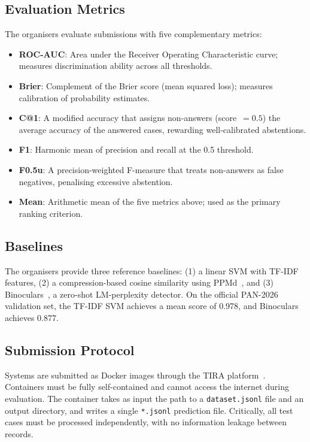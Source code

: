 \subsection{Evaluation Metrics}

The organisers evaluate submissions with five complementary metrics:

\begin{itemize}
  \item \textbf{ROC-AUC}: Area under the Receiver Operating Characteristic curve; measures discrimination ability across all thresholds.
  \item \textbf{Brier}: Complement of the Brier score (mean squared loss); measures calibration of probability estimates.
  \item \textbf{C@1}: A modified accuracy that assigns non-answers (score~$= 0.5$) the average accuracy of the answered cases, rewarding well-calibrated abstentions.
  \item \textbf{F1}: Harmonic mean of precision and recall at the 0.5 threshold.
  \item \textbf{F0.5u}: A precision-weighted F-measure that treats non-answers as false negatives, penalising excessive abstention.
  \item \textbf{Mean}: Arithmetic mean of the five metrics above; used as the primary ranking criterion.
\end{itemize}

\subsection{Baselines}

The organisers provide three reference baselines: (1) a linear SVM with TF-IDF features, (2) a compression-based cosine similarity using PPMd~\cite{sculley:2006}, and (3) Binoculars~\cite{hans:2024}, a zero-shot LM-perplexity detector. On the official PAN-2026 validation set, the TF-IDF SVM achieves a mean score of 0.978, and Binoculars achieves 0.877.

\subsection{Submission Protocol}

Systems are submitted as Docker images through the TIRA platform~\cite{froebe:2023b}. Containers must be fully self-contained and cannot access the internet during evaluation. The container takes as input the path to a \texttt{dataset.jsonl} file and an output directory, and writes a single \texttt{*.jsonl} prediction file. Critically, all test cases must be processed independently, with no information leakage between records.
